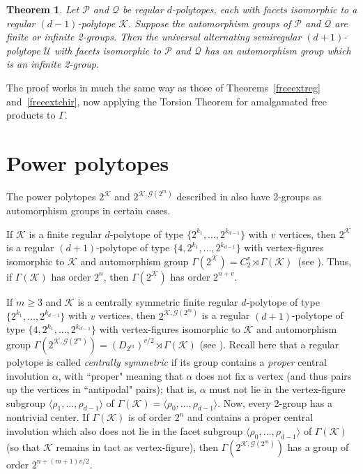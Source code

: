 \documentclass[12pt]{amsart}
\newtheorem{theorem}{Theorem}[section]
\theoremstyle{definition}
\begin{document}
\begin{theorem}
\label{freeextsemireg}
Let $\mathcal{P}$ and $\mathcal{Q}$ be regular $d$-polytopes, each with facets isomorphic to a regular $(d-1)$-polytope $\mathcal{K}$. Suppose the automorphism groups of $\mathcal{P}$ and $\mathcal{Q}$ are finite or infinite 2-groups. Then the universal alternating semiregular $(d+1)$-polytope $\mathcal{U}$ with facets isomorphic to $\mathcal P$ and $\mathcal Q$ has an automorphism group which is an infinite 2-group.  
\end{theorem}

The proof works in much the same way as those of Theorems~\ref{freeextreg} and~\ref{freeextchir}, now applying the Torsion Theorem for amalgamated free products to $\Gamma$.

\section{Power polytopes}
\label{powerpols}

The power polytopes $2^{\mathcal K}$ and $2^{{\mathcal K},{\mathcal G}(2^m)}$ described in  \cite{McMSch2002} also have 2-groups as automorphism groups in certain cases.

If $\mathcal K$ is a finite regular $d$-polytope of type $\{2^{k_1},\ldots,2^{k_{d-1}}\}$ with $v$ vertices, then $2^{\mathcal K}$ is a regular $(d+1)$-polytope of type $\{4,2^{k_1},\ldots,2^{k_{d-1}}\}$ with vertex-figures isomorphic to $\mathcal{K}$ and automorphism group $\Gamma(2^{\mathcal K})=C_2^v\rtimes \Gamma({\mathcal K})$~(see \cite[8C2]{McMSch2002}). Thus, if $\Gamma(\mathcal{K})$ has order $2^n$, then $\Gamma(2^{\mathcal K})$ has order $2^{n+v}$.

If $m\geq 3$ and $\mathcal K$ is a centrally symmetric finite regular $d$-polytope of type $\{2^{k_1},\ldots,2^{k_{d-1}}\}$ with $v$ vertices, then $2^{{\mathcal K},{\mathcal G}(2^m)}$ is a regular $(d+1)$-polytope of type $\{4,2^{k_1},\ldots,2^{k_{d-1}}\}$ with vertex-figures isomorphic to $\mathcal{K}$ and automorphism group $\Gamma(2^{{\mathcal K},{\mathcal G}(2^m)})=(D_{2^m})^{v/2}\rtimes \Gamma({\mathcal K})$ (see \cite[8C5]{McMSch2002}). Recall here that a regular polytope is called {\it centrally symmetric\/} if its group contains a {\it proper\/} central involution $\alpha$, with ``proper" meaning that $\alpha$ does not fix a vertex (and thus pairs up the vertices in ``antipodal" pairs); that is, $\alpha$ must not lie in the vertex-figure subgroup $\langle\rho_1,\ldots,\rho_{d-1}\rangle$ of $\Gamma(\mathcal{K})=\langle\rho_0,\ldots,\rho_{d-1}\rangle$. Now, every 2-group has a nontrivial center. If $\Gamma(\mathcal{K})$ is of order $2^n$ and contains a proper central involution which also does not lie in the facet subgroup $\langle\rho_0,\ldots,\rho_{d-1}\rangle$ of $\Gamma(\mathcal{K})$ (so that $\mathcal{K}$ remains in tact as vertex-figure), then $\Gamma(2^{{\mathcal K},{\mathcal G}(2^m)})$ has a group of order $2^{n+(m+1)v/2}$.
\end{document}
